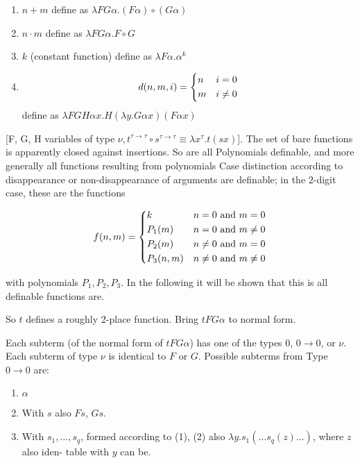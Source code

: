 \documentclass[11pt]{article}
\begin{document}
\begin{enumerate}
    \item \(n + m\) define as \(\lambda F G \alpha. (F \alpha) \circ (G \alpha)\)
    \item \(n \cdot m\) define as \(\lambda F G \alpha. F \circ G\)
    \item \(k\) (constant function) define as \(\lambda F \alpha . \alpha ^ k\)
    \item \[ d(n, m, i) =
        \begin{dcases}
            n & i = 0 \\
            m & i \neq 0 \\
        \end{dcases}
    \] define as \(\lambda F G H \alpha x. H(\lambda y. G \alpha x) (F \alpha x)\)
\end{enumerate}

[F, G, H variables of type \(\nu, t^{\tau \rightarrow \tau} \circ s^{\tau \rightarrow \tau} \equiv \lambda x^\tau. t(s x)\)]. The set of
bare functions is apparently closed against insertions. So are all Polynomials definable, and more generally all functions resulting from polynomials Case distinction according to disappearance or non-disappearance of arguments
are definable; in the 2-digit case, these are the functions

\[ f(n, m) =
        \begin{dcases}
            k & n = 0 \text{ and } m = 0 \\
            P_1(m) & n = 0 \text{ and } m \neq 0 \\
            P_2(m) & n \neq 0 \text{ and } m = 0 \\
            P_3(n, m) & n \neq 0 \text{ and } m \neq 0 \\
        \end{dcases}
\]

with polynomials \(P_1, P_2, P_3\). In the following it will be shown that this is all definable functions are.

So \(t\) defines a roughly 2-place function. Bring \(t F G \alpha\) to normal form.

Each subterm (of the normal form of \(t F G \alpha\)) has one of the types $0$, $0 \rightarrow 0$, or \(\nu\). Each subterm of type \(\nu\) is identical to $F$ or $G$. Possible subterms from Type \(0 \rightarrow 0\) are:

\begin{enumerate}
    \item \(\alpha\)
    \item With $s$ also $Fs$, $Gs$.
    \item With \(s_1, ..., s_q\), formed according to (1), (2) also \(\lambda y. s_1 (... s_q(z)...)\), where $z$ also iden-
    table with $y$ can be.
\end{enumerate}
\end{document}

